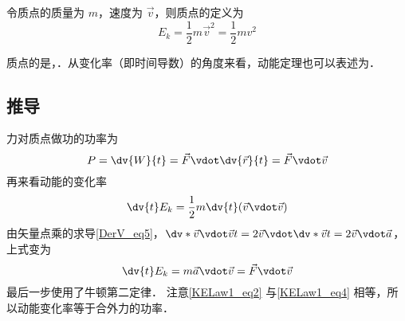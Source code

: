 

令质点的质量为 $m$，速度为 $\vec v$，则质点的定义为
\begin{equation}
E_k = \frac12 m\vec v^2 = \frac12 mv^2
\end{equation}

质点的是，．从变化率（即时间导数）的角度来看，动能定理也可以表述为．

\subsection{推导}
力对质点做功的功率为
\begin{equation}\label{KELaw1_eq2}
P = \dv{W}{t} =  \vec F\vdot \dv{\vec r}{t} = \vec F\vdot\vec v
\end{equation}
再来看动能的变化率
\begin{equation}
\dv{t} E_k = \frac12 m\dv{t} (\vec v\vdot\vec v)
\end{equation}
由矢量点乘的求导\autoref{DerV_eq5}，$\dv*{\vec v\vdot\vec v}{t} = 2\vec v\vdot \dv*{\vec v}{t} = 2\vec v\vdot\vec a$，上式变为
\begin{equation}\label{KELaw1_eq4}
\dv{t} E_k = m\vec a\vdot\vec v = \vec F\vdot\vec v
\end{equation}
最后一步使用了牛顿第二定律．%
注意\autoref{KELaw1_eq2} 与\autoref{KELaw1_eq4} 相等，所以动能变化率等于合外力的功率．